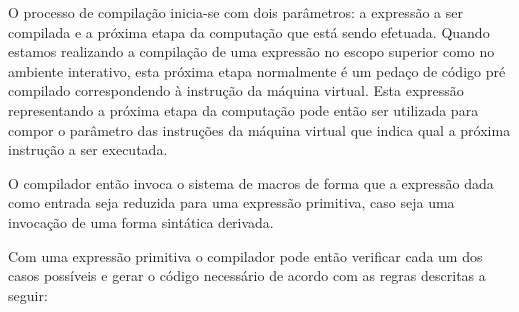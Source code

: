 O processo de compilação inicia-se com dois parâmetros: a expressão a ser
compilada e a próxima etapa da computação que está sendo efetuada. Quando
estamos realizando a compilação de uma expressão no escopo superior como no
ambiente interativo, esta próxima etapa normalmente é um pedaço de código pré
compilado correspondendo à instrução  da máquina virtual. Esta
expressão representando a próxima etapa da computação pode então ser utilizada
para compor o parâmetro das instruções da máquina virtual que indica qual a
próxima instrução a ser executada.

O compilador então invoca o sistema de macros de forma que a expressão dada como
entrada seja reduzida para uma expressão primitiva, caso seja uma invocação de
uma forma sintática derivada.

Com uma expressão primitiva o compilador pode então verificar cada um dos casos
possíveis e gerar o código necessário de acordo com as regras descritas a
seguir:

